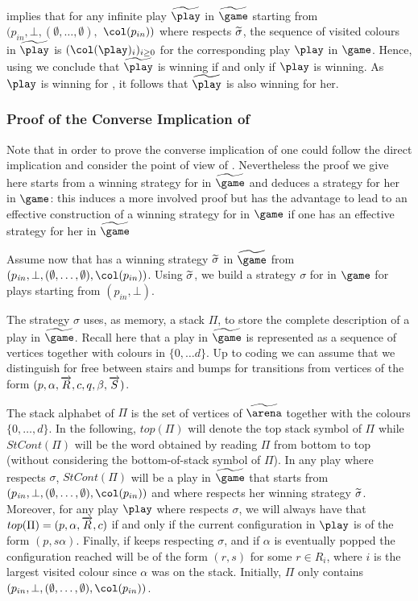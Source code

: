  implies that for any infinite play
$\fplay$ in $\fgame$ starting from
$(p_{in},\bot,(\emptyset,\dots,\emptyset),$ $\pdscol{p_{in}})$
where \Eve respects $\widetilde{\sigma}$, the sequence of visited colours in $\fplay$ is
$(\pdscol{\play}_i)_{i\geq 0}$ for the corresponding play $\play$
in $\game$.
Hence, using  we conclude that
$\fplay$ is winning if
and only if $\play$ is winning. As $\play$
is winning for \Eve, it follows that $\fplay$ is also winning for
her.


\subsubsection{Proof of the Converse Implication of }
\label{11-sec:strategy-pushdown}

Note that in order to prove the converse implication of  one could follow the direct implication and consider the point of view of \Adam. Nevertheless the proof we give here starts from a winning strategy for \Eve in $\fgame$ and deduces a strategy for her in $\game$: this induces a more involved proof but has the advantage to lead to an effective construction of a winning strategy for \Eve in $\game$ if one has an effective strategy for her in $\fgame$


Assume now that \Eve has a winning strategy $\widetilde{\sigma}$ in $\fgame$
from $(p_{\mathit in},\bot,(\emptyset,\dots,\emptyset),\pdscol{p_{in}})$.
Using $\widetilde{\sigma}$, we build a strategy $\sigma$ for \Eve in
$\game$ for plays starting from $(p_{\mathit in},\bot)$.

The strategy $\sigma$ uses, as memory, a stack $\Pi$, to store the complete
description of a play in $\fgame$. Recall here that a play in
$\fgame$ is represented as a sequence of vertices together with
colours in $\{0,\dots d\}$. Up to coding we can assume that we distinguish for free between stairs and bumps for transitions from vertices of the form $(p,\alpha,\overrightarrow{R},c,q,\beta,\overrightarrow{S})$. %



The stack alphabet of $\Pi$ is the set of vertices of 
$\farena$ together with the colours $\{0,\dots,d\}$. In the following, $top(\Pi)$ will denote
the top stack symbol of $\Pi$ while $StCont(\Pi)$ will be
the word obtained by reading $\Pi$ from bottom to top (without
considering the bottom-of-stack symbol of $\Pi$). In any play
where \Eve respects $\sigma$, $StCont(\Pi)$ will be a play
in $\fgame$ that starts from $(p_{\mathit
in},\bot,(\emptyset,\dots,\emptyset),\pdscol{p_{in}})$ and where
\Eve respects her winning strategy $\widetilde{\sigma}$. Moreover, for any
play $\play$ where \Eve respects $\sigma$, we will always have that
$top(\Pi)=(p,\alpha,\overrightarrow{R},c)$ if and only if
the current configuration in $\play$ is of the form
$(p,s\alpha)$. Finally, if \Eve keeps respecting $\sigma$, and
if $\alpha$  is eventually popped the configuration reached
will be of the form $(r,s)$ for some $r\in R_i$, where
$i$ is the largest visited colour since $\alpha$  was on the stack.
Initially, $\Pi$ only contains $(p_{in},\bot,(\emptyset,\dots,\emptyset),\pdscol{p_{in}})$.

